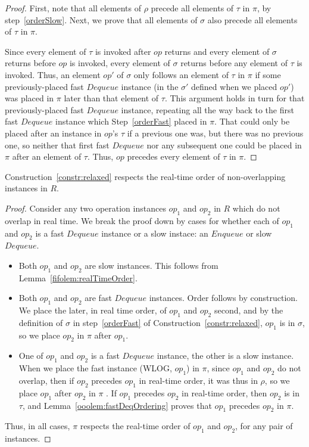 \documentclass[a4paper,anonymous,USenglish]{lipics-v2021}
\theoremstyle{definition}
\begin{document}
\begin{proof}
  First, note that all elements of $\rho$ precede all elements of $\tau$ in $\pi$, by step~\ref{orderSlow}.  Next, we prove that all elements of $\sigma$ also precede all elements of $\tau$ in $\pi$.

  Since every element of $\tau$ is invoked after $op$ returns and every element of $\sigma$ returns before $op$ is invoked, every element of $\sigma$ returns before any element of $\tau$ is invoked.  Thus, an element $op'$ of $\sigma$ only follows an element of $\tau$ in $\pi$ if some previously-placed fast $Dequeue$ instance (in the $\sigma'$ defined when we placed $op'$) was placed in $\pi$ later than that element of $\tau$.  This argument holds in turn for that previously-placed fast $Dequeue$ instance, repeating all the way back to the first fast $Dequeue$ instance which Step~\ref{orderFast} placed in $\pi$.  That could only be placed after an instance in $op$'s $\tau$ if a previous one was, but there was no previous one, so neither that first fast $Dequeue$ nor any subsequent one could be placed in $\pi$ after an element of $\tau$.  Thus, $op$ precedes every element of $\tau$ in $\pi$.
\end{proof}

\begin{lemma}
  Construction~\ref{constr:relaxed} respects the real-time order of non-overlapping instances in $R$.
\end{lemma}

\begin{proof}
  Consider any two operation instances $op_1$ and $op_2$ in $R$ which do not overlap in real time.  We break the proof down by cases for whether each of $op_1$ and $op_2$ is a fast $Dequeue$ instance or a slow instace: an $Enqueue$ or slow $Dequeue$.
  \begin{itemize}
  \item Both $op_1$ and $op_2$ are slow instances.  This follows from Lemma~\ref{fifolem:realTimeOrder}.
  \item Both $op_1$ and $op_2$ are fast $Dequeue$ instances.  Order follows by construction.  We place the later, in real time order, of $op_1$ and $op_2$ second, and by the definition of $\sigma$ in step~\ref{orderFast} of Construction~\ref{constr:relaxed}, $op_1$ is in $\sigma$, so we place $op_2$ in $\pi$ after $op_1$.
  \item One of $op_1$ and $op_2$ is a fast $Dequeue$ instance, the other is a slow instance.  When we place the fast instance (WLOG, $op_1$) in $\pi$, since $op_1$ and $op_2$ do not overlap, then if $op_2$ precedes $op_1$ in real-time order, it was thus in $\rho$, so we place $op_1$ after $op_2$ in $\pi$ .  If $op_1$ precedes $op_2$ in real-time order, then $op_2$ is in $\tau$, and Lemma~\ref{ooolem:fastDeqOrdering} proves that $op_1$ precedes $op_2$ in $\pi$.
  \end{itemize}

  Thus, in all cases, $\pi$ respects the real-time order of $op_1$ and $op_2$, for any pair of instances.
\end{proof}
\end{document}
